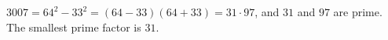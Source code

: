 $3007=64^2-33^2=(64-33)(64+33)=31\cdot97$, and $31$ and $97$ are prime. The smallest prime factor is $\boxed{31}$.
